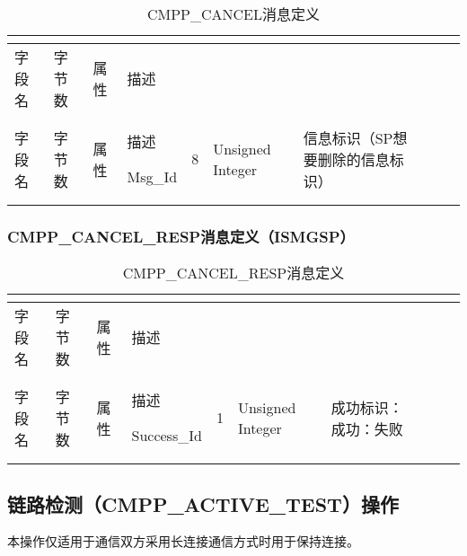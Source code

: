 \documentclass[11pt]{book} %
\begin{document}
\begin{longtable}{|m{90pt}|m{35pt}|m{80pt}|m{200pt}|}
\tabularnewline\hline
字段名&字节数&属性&描述
\endhead

\caption{CMPP\_CANCEL消息定义}\\
\hline
字段名&字节数&属性&描述
\endfirsthead

\endfoot

\endlastfoot

\hline
Msg\_Id&8&Unsigned Integer&信息标识（SP想要删除的信息标识）\\
\hline
\end{longtable}



\subsubsection{CMPP\_CANCEL\_RESP消息定义（ISMG\textrightarrow SP）}



\begin{longtable}{|m{90pt}|m{35pt}|m{80pt}|m{200pt}|}
\tabularnewline\hline
字段名&字节数&属性&描述
\endhead

\caption{CMPP\_CANCEL\_RESP消息定义}\\
\hline
字段名&字节数&属性&描述
\endfirsthead

\endfoot

\endlastfoot

\hline
Success\_Id&1&Unsigned Integer&成功标识：成功：失败\\
\hline
\end{longtable}



\subsection{链路检测（CMPP\_ACTIVE\_TEST）操作}

本操作仅适用于通信双方采用长连接通信方式时用于保持连接。
%
%
%
%
%
\end{document}
